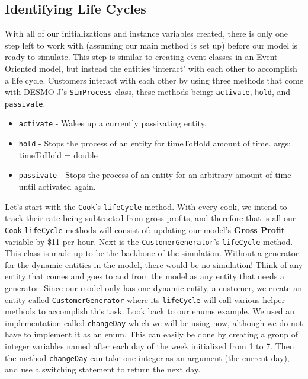 \documentclass[11pt]{article}
\newcommand{\class}[1]{\texttt{#1}}
\newcommand{\method}[1]{\texttt{#1}}
\begin{document}
\subsection*{ Identifying Life Cycles }
With all of our initializations and instance variables created, there is only one step left to work with (assuming our main method is set up) before our model is ready to simulate. This step is similar to creating event classes in an Event-Oriented model, but instead the entities `interact' with each other to accomplish a life cycle.
\newline
Customers interact with each other by using three methods that come with DESMO-J's \class{SimProcess} class, these methods being: \method{activate}, \method{hold}, and \method{passivate}.
\begin{itemize}[noitemsep]
	\item \method{activate} - Wakes up a currently passivating entity.
	\item \method{hold}  - Stops the process of an entity for timeToHold amount of time. {args: timeToHold = double}
	\item \method{passivate} - Stops the process of an entity for an arbitrary amount of time until activated again.
\end{itemize}
Let's start with the \class{Cook}'s \method{lifeCycle} method. With every cook, we intend to track their rate being subtracted from gross profits, and therefore that is all our \class{Cook} \method{lifeCycle} methods will consist of: updating our model's \textbf{Gross Profit} variable by \$11 per hour.
\newline
Next is the \class{CustomerGenerator}'s \method{lifeCycle} method. This class is made up to be the backbone of the simulation. Without a generator for the dynamic entities in the model, there would be no simulation! Think of any entity that comes and goes to and from the model as any entity that needs a generator. Since our model only has one dynamic entity, a customer, we create an entity called \class{CustomerGenerator} where its \method{lifeCycle} will call various helper methods to accomplish this task. Look back to our enums example. We used an implementation called \method{changeDay} which we will be using now, although we do not have to implement it as an enum. This can easily be done by creating a group of integer variables named after each day of the week initialized from 1 to 7. Then the method \method{changeDay} can take one integer as an argument (the current day), and use a switching statement to return the next day.
\end{document}
